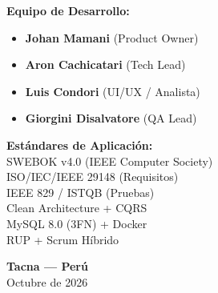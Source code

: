 \begin{titlepage}
    \begin{minipage}[t]{0.48\textwidth}
        \textbf{\large Equipo de Desarrollo:}\\[0.2cm]
        \begin{itemize}
            \item \textbf{Johan Mamani} (Product Owner)
            \item \textbf{Aron Cachicatari} (Tech Lead)
            \item \textbf{Luis Condori} (UI/UX / Analista)
            \item \textbf{Giorgini Disalvatore} (QA Lead)
        \end{itemize}
    \end{minipage}
    \hfill
    \begin{minipage}[t]{0.48\textwidth}
        \begin{flushright}
            \textbf{\large Estándares de Aplicación:}\\[0.2cm]
            {\small
            SWEBOK v4.0 (IEEE Computer Society)\\
            ISO/IEC/IEEE 29148 (Requisitos)\\
            IEEE 829 / ISTQB (Pruebas)\\
            Clean Architecture + CQRS\\
            MySQL 8.0 (3FN) + Docker\\
            RUP + Scrum Híbrido
            }
        \end{flushright}
    \end{minipage}
    
    \vfill
    {\large\bfseries Tacna — Perú}\\[0.2cm]
    {\large Octubre de 2026}
\end{titlepage}
